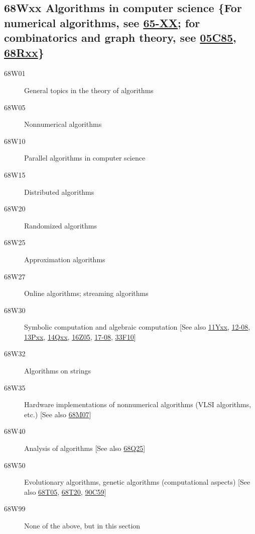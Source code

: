\subsection*{68Wxx  Algorithms in computer science \{For numerical algorithms, see \hyperref[65-XX]{65-XX}; for combinatorics and graph theory, see \hyperref[05C85]{05C85}, \hyperref[68Rxx]{68Rxx}\} }\label{68Wxx}
\begin{description}
\item [68W01]\label{68W01} General topics in the theory of algorithms
\item [68W05]\label{68W05} Nonnumerical algorithms
\item [68W10]\label{68W10} Parallel algorithms in computer science
\item [68W15]\label{68W15} Distributed algorithms
\item [68W20]\label{68W20} Randomized algorithms
\item [68W25]\label{68W25} Approximation algorithms
\item [68W27]\label{68W27} Online algorithms; streaming algorithms
\item [68W30]\label{68W30} Symbolic computation and algebraic computation [See also \hyperref[11Yxx]{11Yxx}, \hyperref[12-08]{12-08}, \hyperref[13Pxx]{13Pxx}, \hyperref[14Qxx]{14Qxx}, \hyperref[16Z05]{16Z05}, \hyperref[17-08]{17-08}, \hyperref[33F10]{33F10}]
\item [68W32]\label{68W32} Algorithms on strings
\item [68W35]\label{68W35} Hardware implementations of nonnumerical algorithms (VLSI algorithms, etc.) [See also \hyperref[68M07]{68M07}]
\item [68W40]\label{68W40} Analysis of algorithms [See also \hyperref[68Q25]{68Q25}]
\item [68W50]\label{68W50} Evolutionary algorithms, genetic algorithms (computational aspects) [See also \hyperref[68T05]{68T05}, \hyperref[68T20]{68T20}, \hyperref[90C59]{90C59}]
\item [68W99]\label{68W99} None of the above, but in this section
\end{description}
